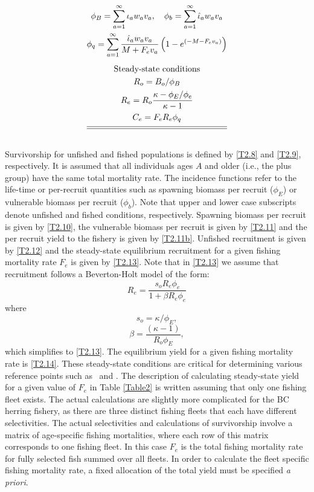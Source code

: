 \begin{table}[!tbp]
\begin{gather}
            \phi_B=\sum_{a=1}^\infty \iota_a w_a v_a, \quad
            \phi_b=\sum_{a=1}^\infty \hat{\iota}_a w_a v_a \label{T2.11}\\
            \phi_q=\sum_{a=1}^\infty
                \frac{ \hat{\iota}_a w_a v_a}{M+F_ev_a}
                \left(1-e^{(-M-F_ev_a)}\right) \label{T2.11b} \\[1ex]
        \mbox{Steady-state conditions} \nonumber \\
        R_o=B_o/ \phi_B \label{T2.12}\\
        R_e=R_o\frac{\kappa-\phi_E/\phi_e}{\kappa-1} \label{T2.13}\\
        C_e=F_e R_e \phi_q\label{T2.14} \\[1ex]
        \hline \hline \nonumber
    \end{gather}
    \normalEq
\end{table}
Survivorship for unfished and fished populations is defined by \eqref{T2.8} and \eqref{T2.9}, respectively.  It is assumed that all individuals ages $A$ and older (i.e., the plus group) have the same total mortality rate.  The incidence functions refer to the life-time or per-recruit quantities such as spawning biomass per recruit ($\phi_E$) or vulnerable biomass per recruit ($\phi_b$).  Note that upper and lower case subscripts denote unfished and fished conditions, respectively.  Spawning biomass per recruit is given by \eqref{T2.10}, the vulnerable biomass per recruit is given by \eqref{T2.11} and the per recruit yield to the fishery is given by \eqref{T2.11b}.  Unfished recruitment is given by \eqref{T2.12} and the steady-state equilibrium recruitment  for a given fishing mortality rate $F_e$ is given by \eqref{T2.13}.  Note that in \eqref{T2.13} we assume that recruitment follows a Beverton-Holt model of the form:
\[
R_e=\frac{s_o R_e \phi_e}{1+\beta R_e \phi_e}
\]
where
\[
s_o = \kappa/\phi_E,
\]
\[
\beta = \frac{(\kappa-1)}{R_o\phi_E},
\]
which simplifies to \eqref{T2.13}.
The equilibrium yield for a given fishing mortality rate is \eqref{T2.14}.  These steady-state conditions are critical for determining various reference points such as \fmsy\ and \bmsy. The description of calculating steady-state yield for a given value of $F_e$ in Table \ref{Table2} is written assuming that only one fishing fleet exists.  The actual calculations are slightly more complicated for the BC herring fishery, as there are three distinct fishing fleets that each have different selectivities.  The actual selectivities and calculations of survivorship involve a matrix of age-specific fishing mortalities, where each row of this matrix corresponds to one fishing fleet.  In this case $F_e$ is the total fishing mortality rate for fully selected fish summed over all fleets.  In order to calculate the fleet specific fishing mortality rate, a fixed allocation of the total yield must be specified \textit{a priori}.
	
